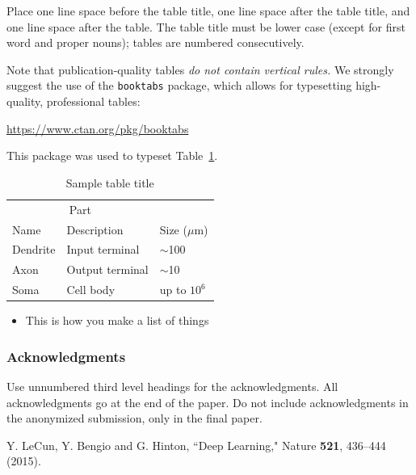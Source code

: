 \documentclass{article}
\begin{document}
Place one line space before the table title, one line space after the
table title, and one line space after the table. The table title must
be lower case (except for first word and proper nouns); tables are
numbered consecutively.

Note that publication-quality tables \emph{do not contain vertical rules.} We
strongly suggest the use of the \verb+booktabs+ package, which allows for
typesetting high-quality, professional tables:
\begin{center}
  \url{https://www.ctan.org/pkg/booktabs}
\end{center}
This package was used to typeset Table~\ref{sample-table}.

\begin{table}
  \caption{Sample table title}
  \label{sample-table}
  \centering
  \begin{tabular}{lll}
    \toprule
    \multicolumn{2}{c}{Part}                   \\
    \cmidrule(r){1-2}
    Name     & Description     & Size ($\mu$m) \\
    \midrule
    Dendrite & Input terminal  & $\sim$100     \\
    Axon     & Output terminal & $\sim$10      \\
    Soma     & Cell body       & up to $10^6$  \\
    \bottomrule
  \end{tabular}
\end{table}


\begin{itemize}

\item This is how you make a list of things

\end{itemize}

\subsubsection*{Acknowledgments}

Use unnumbered third level headings for the acknowledgments. All acknowledgments
go at the end of the paper. Do not include acknowledgments in the anonymized
submission, only in the final paper.





\begin{thebibliography}{99}

 Y. LeCun, Y. Bengio and G. Hinton, ``Deep Learning," Nature {\bf 521}, 436--444 (2015).

 \end{thebibliography}
 
\end{document}
